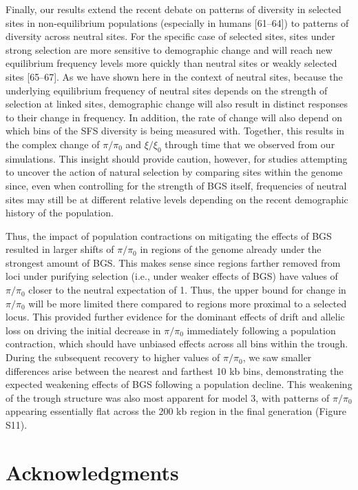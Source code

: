 \documentclass[9pt,twocolumn,twoside]{rilabRxiv}
\begin{document}
Finally, our results extend the recent
debate on patterns of diversity in selected sites in non-equilibrium
populations (especially in humans [61--64]) to patterns of diversity
across neutral sites. For the specific case of selected sites, sites
under strong selection are more sensitive to demographic change and will
reach new equilibrium frequency levels more quickly than neutral sites
or weakly selected sites [65--67]. As we have shown here in the
context of neutral sites, because the underlying equilibrium frequency
of neutral sites depends on the strength of selection at linked sites,
demographic change will also result in distinct responses to their
change in frequency. In addition, the rate of change will also depend on
which bins of the SFS diversity is being measured with. Together, this
results in the complex change of $\pi/\pi_0$ and
$\xi/\xi_0$ through time that we observed from our simulations.
This insight should provide caution, however, for studies attempting to
uncover the action of natural selection by comparing sites within the
genome since, even when controlling for the strength of BGS itself,
frequencies of neutral sites may still be at different relative levels
depending on the recent demographic history of the population.



Thus, the
impact of population contractions on mitigating the effects of BGS
resulted in larger shifts of $\pi/\pi_0$ in regions of the
genome already under the strongest amount of BGS.
This makes sense since regions farther removed from loci under purifying selection (i.e., under weaker effects of BGS) have values of $\pi/\pi_0$ closer to the neutral expectation of 1.
Thus, the upper bound for change in $\pi/\pi_0$ will be more limited there compared to regions more
proximal to a selected locus.
This provided further evidence for the dominant effects of
drift and allelic loss on driving the initial decrease in
$\pi/\pi_0$ immediately following a population contraction,
which should have unbiased effects across all bins within the trough.
During the subsequent recovery to higher values of $\pi/\pi_0$, we saw smaller differences arise
between the nearest and farthest 10 kb bins, demonstrating the expected
weakening effects of BGS following a population decline. This weakening
of the trough structure was also most apparent for model 3, with
patterns of $\pi/\pi_0$ appearing essentially flat across the
200 kb region in the final generation (Figure S11).

\section{Acknowledgments}
\end{document}
